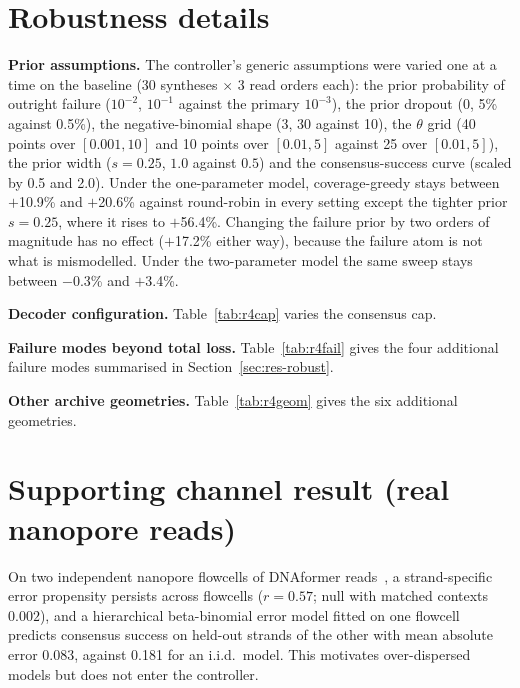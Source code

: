 \documentclass[acmsmall,screen]{acmart}
\begin{document}
\section{Robustness details}\label{supp:robust}
\textbf{Prior assumptions.}  The controller's generic assumptions were varied one at a time on the
baseline (30 syntheses $\times$ 3 read orders each): the prior probability of outright failure
($10^{-2}$, $10^{-1}$ against the primary $10^{-3}$), the prior dropout (0, 5\% against 0.5\%), the
negative-binomial shape (3, 30 against 10), the $\theta$ grid (40 points over $[0.001,10]$ and 10 points
over $[0.01,5]$ against 25 over $[0.01,5]$), the prior width ($s{=}0.25$, $1.0$ against $0.5$) and the
consensus-success curve (scaled by 0.5 and 2.0).  Under the one-parameter model, coverage-greedy stays
between $+$10.9\% and $+$20.6\% against round-robin in every setting except the tighter prior
$s{=}0.25$, where it rises to $+$56.4\%.  Changing the failure prior by two orders of magnitude has no
effect ($+$17.2\% either way), because the failure atom is not what is mismodelled.  Under the
two-parameter model the same sweep stays between $-$0.3\% and $+$3.4\%.

\textbf{Decoder configuration.}  Table~\ref{tab:r4cap} varies the consensus cap.


\textbf{Failure modes beyond total loss.}  Table~\ref{tab:r4fail} gives the four additional failure
modes summarised in Section~\ref{sec:res-robust}.


\textbf{Other archive geometries.}  Table~\ref{tab:r4geom} gives the six additional geometries.


\section{Supporting channel result (real nanopore reads)}\label{supp:nanopore}
On two independent nanopore flowcells of DNAformer reads~\cite{barlev2025deep,technion2025dnaformerreads},
a strand-specific error propensity persists across flowcells ($r{=}0.57$; null with matched contexts
$0.002$), and a hierarchical beta-binomial error model fitted on one flowcell predicts consensus success
on held-out strands of the other with mean absolute error 0.083, against 0.181 for an i.i.d.\ model.  This
motivates over-dispersed models but does not enter the controller.
\end{document}
